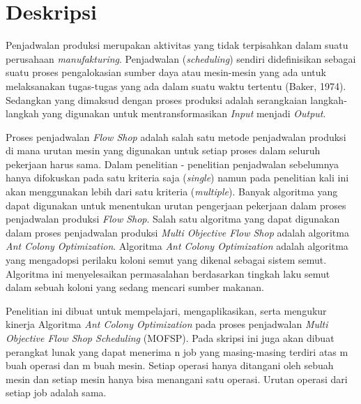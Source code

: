 \documentclass[a4paper,twoside]{article}
\begin{document}
\title{\@judultopik}
\author{\nama \textendash \@npm} 

\newcommand{\nama}{Kevin Jonathan}
\newcommand{\@npm}{2014730020}
\newcommand{\@judultopik}{Ant Colony Optimization (ACO) untuk Permasalahan Multi Objective Flowshop Scheduling (MOFSP)} %
\newcommand{\jumpemb}{1} %
\newcommand{\tanggal}{06/09/2018}


\maketitle


\section{Deskripsi}

Penjadwalan produksi merupakan aktivitas yang tidak terpisahkan dalam suatu perusahaan {\it manufakturing}. Penjadwalan ({\it scheduling}) sendiri didefinisikan sebagai suatu proses pengalokasian sumber daya atau mesin-mesin yang ada untuk melaksanakan tugas-tugas yang ada dalam suatu waktu tertentu (Baker, 1974). Sedangkan yang dimaksud dengan proses produksi adalah serangkaian langkah-langkah yang digunakan untuk mentransformasikan {\it Input} menjadi {\it Output}.

Proses penjadwalan {\it Flow Shop} adalah salah satu metode penjadwalan produksi di mana urutan mesin yang digunakan untuk setiap proses dalam seluruh pekerjaan harus sama. Dalam penelitian - penelitian penjadwalan sebelumnya hanya difokuskan pada satu kriteria saja ({\it single}) namun pada penelitian kali ini akan menggunakan lebih dari satu kriteria ({\it multiple}). Banyak algoritma yang dapat digunakan untuk menentukan urutan  pengerjaan pekerjaan dalam proses penjadwalan produksi {\it Flow Shop}. Salah satu algoritma yang dapat digunakan dalam proses penjadwalan produksi {\it Multi Objective Flow Shop} adalah algoritma {\it Ant Colony Optimization}. Algoritma {\it Ant Colony Optimization} adalah algoritma yang mengadopsi perilaku koloni semut yang dikenal sebagai sistem semut. Algoritma ini menyelesaikan permasalahan berdasarkan tingkah laku semut dalam sebuah koloni yang sedang mencari sumber makanan.

Penelitian ini dibuat untuk mempelajari, mengaplikasikan, serta mengukur kinerja Algoritma {\it Ant Colony Optimization} pada proses penjadwalan {\it Multi Objective Flow Shop Scheduling} (MOFSP). Pada skripsi ini juga akan dibuat perangkat lunak yang dapat menerima n job yang masing-masing terdiri atas m buah operasi dan m buah mesin. Setiap operasi hanya ditangani oleh sebuah mesin dan setiap mesin hanya bisa menangani satu operasi. Urutan operasi dari setiap job adalah sama.
\end{document}
